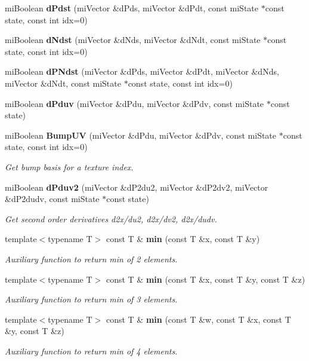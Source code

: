 \begin{CompactItemize}
mi\-Boolean {\bf d\-Pdst} (mi\-Vector \&d\-Pds, mi\-Vector \&d\-Pdt, const mi\-State $\ast$const state, const int idx=0)
\item 
mi\-Boolean {\bf d\-Ndst} (mi\-Vector \&d\-Nds, mi\-Vector \&d\-Ndt, const mi\-State $\ast$const state, const int idx=0)
\item 
mi\-Boolean {\bf d\-PNdst} (mi\-Vector \&d\-Pds, mi\-Vector \&d\-Pdt, mi\-Vector \&d\-Nds, mi\-Vector \&d\-Ndt, const mi\-State $\ast$const state, const int idx=0)
\item 
mi\-Boolean {\bf d\-Pduv} (mi\-Vector \&d\-Pdu, mi\-Vector \&d\-Pdv, const mi\-State $\ast$const state)
\item 
mi\-Boolean {\bf Bump\-UV} (mi\-Vector \&d\-Pdu, mi\-Vector \&d\-Pdv, const mi\-State $\ast$const state, const int idx=0)
\begin{CompactList}\small\item\em Get bump basis for a texture index. \item\end{CompactList}\item 
mi\-Boolean {\bf d\-Pduv2} (mi\-Vector \&d\-P2du2, mi\-Vector \&d\-P2dv2, mi\-Vector \&d\-P2dudv, const mi\-State $\ast$const state)
\begin{CompactList}\small\item\em Get second order derivatives d2x/du2, d2x/dv2, d2x/dudv. \item\end{CompactList}\item 
template$<$typename T$>$ const T \& {\bf min} (const T \&x, const T \&y)
\begin{CompactList}\small\item\em Auxiliary function to return min of 2 elements. \item\end{CompactList}\item 
template$<$typename T$>$ const T \& {\bf min} (const T \&x, const T \&y, const T \&z)
\begin{CompactList}\small\item\em Auxiliary function to return min of 3 elements. \item\end{CompactList}\item 
template$<$typename T$>$ const T \& {\bf min} (const T \&w, const T \&x, const T \&y, const T \&z)
\begin{CompactList}\small\item\em Auxiliary function to return min of 4 elements. \item\end{CompactList}\item 

\end{CompactItemize}
